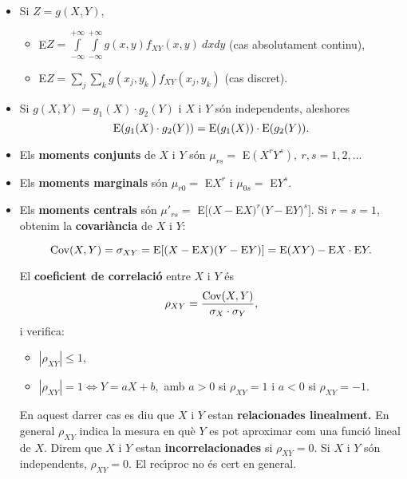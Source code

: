 \begin{itemize}

\item Si $Z = g(X, Y)$,
\begin{itemize}
\item E$Z = \int\limits_{-\infty}^{+\infty}
\int\limits_{-\infty}^{+\infty} g(x,y) f_{XY}(x,y) \> dx dy$ 
(cas absolutament continu),

\item E$\displaystyle Z = \sum\limits_j \sum\limits_k g(x_j,y_k) 
f_{XY}(x_j,y_k)$ (cas discret).
\end{itemize}

\item Si $g(X,Y) = g_1(X) \cdot g_2(Y)$ i $X$ i $Y$ s\'on independents, 
aleshores
$${\rm E} (g_1 (X) \cdot g_2(Y)) = {\rm E} (g_1(X)) \cdot {\rm E} (g_2(Y)).$$

\item Els {\bf moments conjunts} de $X$ i $Y$ s\'on $\mu_{rs}
=$ E$(X^rY^s),  \ r,s = 1, 2, \ldots$

\item Els {\bf moments marginals} s\'on $\mu_{r0} =$ E$X^r$ i
$\mu_{0s} =$ E$Y^s$.

\item Els {\bf moments centrals} s\'on $\mu'_{rs}
=$ E$[(X-$E$X)^r (Y-$E$Y)^s]$. Si $r=s=1$, obtenim la {\bf covari\`ancia}
de $X$ i $Y$:

$${\rm Cov} (X,Y) = \sigma_{XY} = {\rm E}[(X-{\rm E}X) (Y-{\rm E}Y)] = {\rm E}(XY) -
{\rm E}X \cdot {\rm E}Y.$$

El {\bf coeficient de correlaci\'o}
entre $X$ i $Y$ \'es $$\rho_{XY} = {{\rm Cov} (X,Y) \over \sigma_X \cdot \sigma_Y},$$
i verifica:
\begin{itemize}
\item $|\rho_{XY}| \leq 1$,

\item $|\rho_{XY}| = 1 \Longleftrightarrow Y = a X + b,$ amb $a>0$ si $\rho_{XY} = 1$
i $a<0$ si $\rho_{XY} = -1$.
\end{itemize}

En aquest darrer cas es diu que $X$ i $Y$ estan 
{\bf relacionades
linealment.}
En general $\rho_{XY}$ indica la mesura en qu\`e $Y$ es pot aproximar com una
funci\'o
lineal de $X$. Direm que $X$ i $Y$ estan {\bf incorrelacionades}
 si $\rho_{XY} =
0$. Si $X$ i $Y$ s\'on independents, $\rho_{XY} = 0$. El rec\'{\i}proc no \'es
cert en
general.

\end{itemize}

